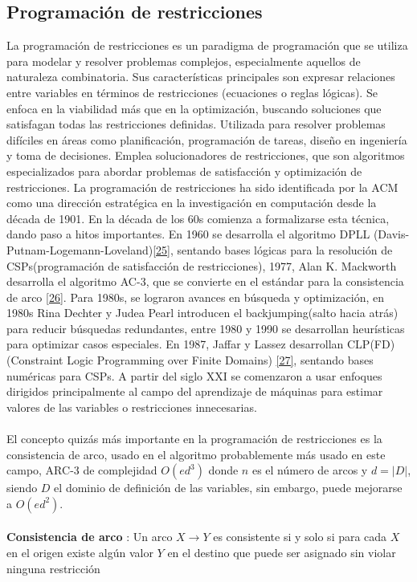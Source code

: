 \documentclass{article}
\begin{document}
    \subsection*{ \Large Programación de restricciones}

La programación de restricciones es un paradigma de programación que se utiliza para modelar y resolver problemas complejos, especialmente aquellos de naturaleza 
combinatoria. Sus características principales son expresar relaciones entre variables en términos de restricciones (ecuaciones o reglas lógicas). Se enfoca en la 
viabilidad más que en la optimización, buscando soluciones que satisfagan todas las restricciones definidas. Utilizada para resolver problemas difíciles en áreas 
como planificación, programación de tareas, diseño en ingeniería y toma de decisiones. Emplea solucionadores de restricciones, que son algoritmos especializados 
para abordar problemas de satisfacción y optimización de restricciones. La programación de restricciones ha sido identificada por la ACM como una dirección estratégica
 en la investigación en computación desde la década de 1901. En la década de los 60s comienza a formalizarse esta técnica, dando paso a hitos importantes. En 1960 
 se desarrolla el algoritmo DPLL (Davis-Putnam-Logemann-Loveland)\hyperref[sec:35]{[25]}, sentando bases lógicas para la resolución de CSPs(programación de satisfacción de restricciones), 1977, Alan K. Mackworth 
 desarrolla el algoritmo AC-3, que se convierte en el estándar para la consistencia de arco \hyperref[sec:36]{[26]}. Para 1980s, se lograron avances en búsqueda y optimización, en 1980s Rina 
 Dechter y Judea Pearl introducen el backjumping(salto hacia atrás) para reducir búsquedas redundantes, entre 1980 y 1990 se desarrollan heurísticas para optimizar 
 casos especiales.  En 1987, Jaffar y Lassez desarrollan CLP(FD) (Constraint Logic Programming over Finite Domains) \hyperref[sec:37]{[27]}, sentando bases numéricas para CSPs. A partir del siglo XXI se comenzaron a usar 
 enfoques dirigidos principalmente al campo del aprendizaje de máquinas para estimar valores de las variables o restricciones innecesarias. \\ \\

El concepto quizás más importante en la programación de restricciones es la consistencia de arco, usado en el algoritmo probablemente más usado en este campo, ARC-3 de complejidad $O(ed^3)$ donde $n$ es el número de arcos y $d=|D|$, siendo $D$ el dominio de definición de las variables, sin embargo, puede mejorarse a $O(ed^2)$. \\ \\
\textbf{ Consistencia de arco }: Un arco $X \rightarrow Y$ es consistente si y solo si para cada $X$ en el origen existe algún valor $Y$ en el destino que puede ser asignado sin violar ninguna restricción \\
\end{document}
